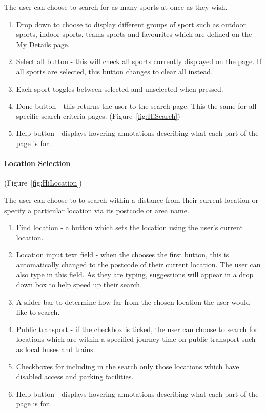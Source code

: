
The user can choose to search for as many sports at once as they wish.
\begin{enumerate}
	\item Drop down to choose to display different groups of sport such as outdoor
		  sports, indoor sports, teams sports and favourites which are defined
		  on the My Details page.
	\item Select all button - this will check all sports currently displayed
		  on the page. If all sports are selected, this button changes to clear
		  all instead.
	\item Each sport toggles between selected and unselected when pressed.
	\item Done button - this returns the user to the search page. This the same
		  for all specific search criteria pages. (Figure~\ref{fig:HiSearch})
	\item Help button - displays hovering annotations describing what each part
		  of the page is for.
\end{enumerate}

\paragraph{Location Selection} (Figure~\ref{fig:HiLocation})


The user can choose to to search within a distance from their current
location or specify a particular location via its postcode or area
name.
\begin{enumerate}
	\item Find location - a button which sets the location using the user's
		  current location.
	\item Location input text field - when the chooses the first button, this
		  is automatically changed to the postcode of their current location.
		  The user can also type in this field. As they are typing, suggestions
		  will appear in a drop down box to help speed up their search.
	\item A slider bar to determine how far from the chosen location the user
		  would like to search.
	\item Public transport - if the checkbox is ticked, the user can choose
		  to search for locations which are within a specified journey time
		  on public transport such as local buses and trains.
	\item Checkboxes for including in the search only those locations which
		  have disabled access and parking facilities.
	\item Help button - displays hovering annotations describing what each part
		  of the page is for.
\end{enumerate}

